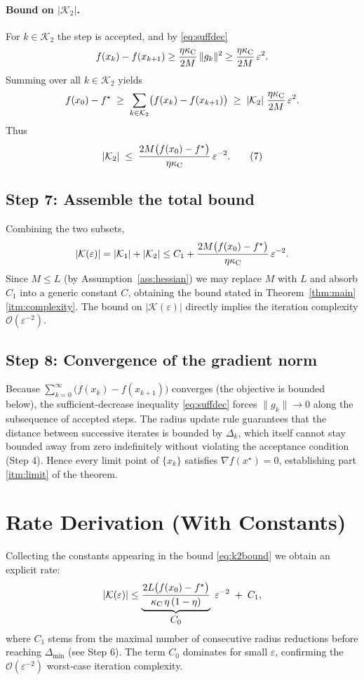 \documentclass{article}
\begin{document}
\paragraph{Bound on $|\mathcal{K}_{2}|$.}
For $k\in\mathcal{K}_{2}$ the step is accepted, and by \eqref{eq:suffdec}
\[
f(x_{k})-f(x_{k+1})
\ge
\frac{\eta\kappa_{\rm C}}{2M}\,\|g_{k}\|^{2}
\ge
\frac{\eta\kappa_{\rm C}}{2M}\,\varepsilon^{2}.
\]
Summing over all $k\in\mathcal{K}_{2}$ yields
\[
f(x_{0})-f^{\star}
\;\ge\;
\sum_{k\in\mathcal{K}_{2}}\bigl(f(x_{k})-f(x_{k+1})\bigr)
\;\ge\;
|\mathcal{K}_{2}|\;\frac{\eta\kappa_{\rm C}}{2M}\,\varepsilon^{2}.
\]
Thus
\[
|\mathcal{K}_{2}|\;\le\;
\frac{2M\bigl(f(x_{0})-f^{\star}\bigr)}{\eta\kappa_{\rm C}}\,
\varepsilon^{-2}.
\tag{7}\label{eq:k2bound}
\]

\subsection*{Step 7: Assemble the total bound}
Combining the two subsets,
\[
|\mathcal{K}(\varepsilon)|
=|\mathcal{K}_{1}|+|\mathcal{K}_{2}|
\le C_{1}+ \frac{2M\bigl(f(x_{0})-f^{\star}\bigr)}{\eta\kappa_{\rm C}}\,
\varepsilon^{-2}.
\]
Since $M\le L$ (by Assumption~\ref{ass:hessian}) we may replace $M$ with $L$ and absorb $C_{1}$ into a generic constant $C$, obtaining the bound stated in Theorem~\ref{thm:main}\ref{itm:complexity}.  The bound on $|\mathcal{K}(\varepsilon)|$ directly implies the iteration complexity $\mathcal{O}(\varepsilon^{-2})$.

\subsection*{Step 8: Convergence of the gradient norm}
Because $\sum_{k=0}^{\infty}\bigl(f(x_{k})-f(x_{k+1})\bigr)$ converges (the objective is bounded below), the sufficient‑decrease inequality \eqref{eq:suffdec} forces $\|g_{k}\|\to0$ along the subsequence of accepted steps.  The radius update rule guarantees that the distance between successive iterates is bounded by $\Delta_{k}$, which itself cannot stay bounded away from zero indefinitely without violating the acceptance condition (Step 4).  Hence every limit point of $\{x_{k}\}$ satisfies $\nabla f(x^{\star})=0$, establishing part \ref{itm:limit} of the theorem. \hfill\qedsymbol

\section*{Rate Derivation (With Constants)}
Collecting the constants appearing in the bound \eqref{eq:k2bound} we obtain an explicit rate:
\[
|\mathcal{K}(\varepsilon)|
\le
\underbrace{\frac{2L\bigl(f(x_{0})-f^{\star}\bigr)}{\kappa_{\rm C}\,\eta\,(1-\eta)}}_{\displaystyle C_{0}}
\;\varepsilon^{-2}
\;+\;
C_{1},
\]
where $C_{1}$ stems from the maximal number of consecutive radius reductions before reaching $\Delta_{\min}$ (see Step 6).  The term $C_{0}$ dominates for small $\varepsilon$, confirming the $\mathcal{O}(\varepsilon^{-2})$ worst‑case iteration complexity.
\end{document}
